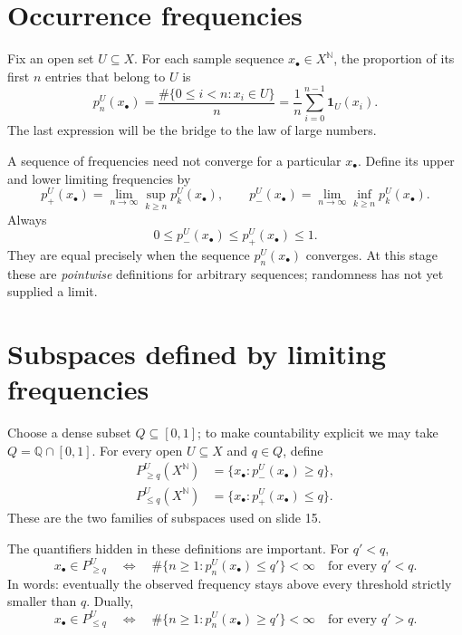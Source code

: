 \section{Occurrence frequencies}

Fix an open set \(U\subseteq X\). For each sample sequence \(x_\bullet\in X^{\mathbb N}\), the proportion of its first \(n\) entries that belong to \(U\) is
\begin{equation}
 p_n^U(x_\bullet)
 =\frac{\#\{0\leq i<n:x_i\in U\}}{n}
 =\frac1n\sum_{i=0}^{n-1}\mathbf1_U(x_i).
 \label{eq:N20261026-empirical-frequency}
\end{equation}
The last expression will be the bridge to the law of large numbers.

A sequence of frequencies need not converge for a particular \(x_\bullet\). Define its upper and lower limiting frequencies by
\[
 p_+^U(x_\bullet)
 =\lim_{n\to\infty}\sup_{k\geq n}p_k^U(x_\bullet),
 \qquad
 p_-^U(x_\bullet)
 =\lim_{n\to\infty}\inf_{k\geq n}p_k^U(x_\bullet).
\]
Always
\[
 0\leq p_-^U(x_\bullet)\leq p_+^U(x_\bullet)\leq1.
\]
They are equal precisely when the sequence \(p_n^U(x_\bullet)\) converges. At this stage these are \emph{pointwise} definitions for arbitrary sequences; randomness has not yet supplied a limit.

\section{Subspaces defined by limiting frequencies}

Choose a dense subset \(Q\subseteq[0,1]\); to make countability explicit we may take \(Q=\mathbb Q\cap[0,1]\). For every open \(U\subseteq X\) and \(q\in Q\), define
\begin{align}
 P_{\geq q}^U(X^{\mathbb N})
 &=\{x_\bullet:p_-^U(x_\bullet)\geq q\},\label{eq:N20261026-Pge}\\
 P_{\leq q}^U(X^{\mathbb N})
 &=\{x_\bullet:p_+^U(x_\bullet)\leq q\}.\label{eq:N20261026-Ple}
\end{align}
These are the two families of subspaces used on slide 15.

The quantifiers hidden in these definitions are important. For \(q'<q\),
\[
 x_\bullet\in P_{\geq q}^U
 \quad\Longleftrightarrow\quad
 \#\{n\geq1:p_n^U(x_\bullet)\leq q'\}<\infty
 \quad\text{for every }q'<q.
\]
In words: eventually the observed frequency stays above every threshold strictly smaller than \(q\). Dually,
\[
 x_\bullet\in P_{\leq q}^U
 \quad\Longleftrightarrow\quad
 \#\{n\geq1:p_n^U(x_\bullet)\geq q'\}<\infty
 \quad\text{for every }q'>q.
\]

